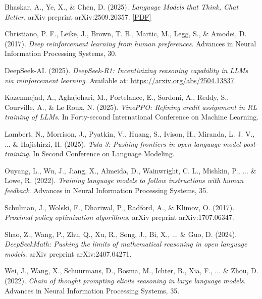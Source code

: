 \documentclass{article}
\begin{document}
\begin{thebibliography}{9}

Bhaskar, A., Ye, X., \& Chen, D. (2025).
\textit{Language Models that Think, Chat Better}.
arXiv preprint arXiv:2509.20357.
\href{http://arxiv.org/pdf/2509.20357v1}{[PDF]}

Christiano, P. F., Leike, J., Brown, T. B., Martic, M., Legg, S., \& Amodei, D. (2017).
\textit{Deep reinforcement learning from human preferences}.
Advances in Neural Information Processing Systems, 30.

DeepSeek-AI. (2025).
\textit{DeepSeek-R1: Incentivizing reasoning capability in LLMs via reinforcement learning}.
Available at: \url{https://arxiv.org/abs/2504.13837}.

Kazemnejad, A., Aghajohari, M., Portelance, E., Sordoni, A., Reddy, S., Courville, A., \& Le Roux, N. (2025).
\textit{VinePPO: Refining credit assignment in RL training of LLMs}.
In Forty-second International Conference on Machine Learning.

Lambert, N., Morrison, J., Pyatkin, V., Huang, S., Ivison, H., Miranda, L. J. V., ... \& Hajishirzi, H. (2025).
\textit{Tulu 3: Pushing frontiers in open language model post-training}.
In Second Conference on Language Modeling.

Ouyang, L., Wu, J., Jiang, X., Almeida, D., Wainwright, C. L., Mishkin, P., ... \& Lowe, R. (2022).
\textit{Training language models to follow instructions with human feedback}.
Advances in Neural Information Processing Systems, 35.

Schulman, J., Wolski, F., Dhariwal, P., Radford, A., \& Klimov, O. (2017).
\textit{Proximal policy optimization algorithms}.
arXiv preprint arXiv:1707.06347.

Shao, Z., Wang, P., Zhu, Q., Xu, R., Song, J., Bi, X., ... \& Guo, D. (2024).
\textit{DeepSeekMath: Pushing the limits of mathematical reasoning in open language models}.
arXiv preprint arXiv:2407.04271.

Wei, J., Wang, X., Schuurmans, D., Bosma, M., Ichter, B., Xia, F., ... \& Zhou, D. (2022).
\textit{Chain of thought prompting elicits reasoning in large language models}.
Advances in Neural Information Processing Systems, 35.

\end{thebibliography}
\end{document}
